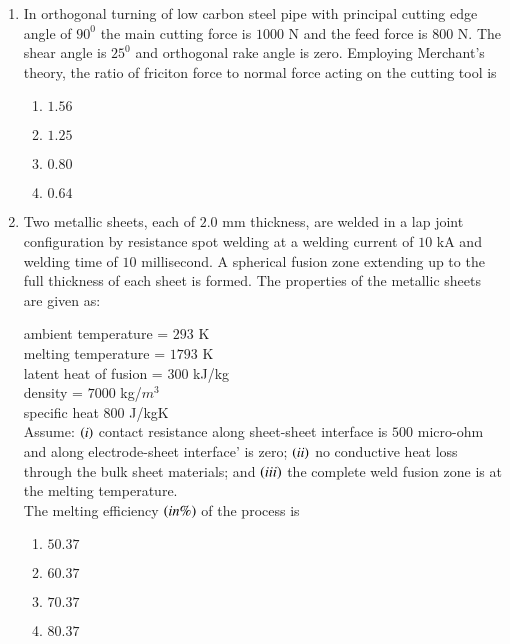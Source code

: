 \documentclass[journal]{IEEEtran}
\begin{document}
\begin{enumerate}[start = 52]
    \item In orthogonal turning of low carbon steel pipe with principal cutting edge angle of $90^{0}$ the main cutting force is $1000$ N and the feed force is $800$ N. The shear angle is $25^{0}$ and orthogonal rake angle is zero. Employing Merchant's theory, the ratio of friciton force to normal force acting on the cutting tool is
    \begin{multicols}{4}
        \begin{enumerate}
            \item $1.56$
            \item $1.25$
            \item $0.80$
            \item $0.64$
        \end{enumerate}
    \end{multicols}

    \item Two metallic sheets, each of $2.0$ mm thickness, are welded in a lap joint configuration by resistance spot welding at a welding current of $10$ kA and welding time of $10$ millisecond. A spherical fusion zone extending up to the full thickness of each sheet is formed. The properties of the metallic sheets are given as:

    ambient temperature = $293$ K \\
    melting temperature = $1793$ K \\
    latent heat of fusion = $300$ kJ/kg\\
    density = $7000$ kg/$m^{3}$ \\
    specific heat $800$ J/kgK\\
    Assume: $\left(i\right)$ contact resistance along sheet-sheet interface is $500$ micro-ohm and along electrode-sheet interface' is zero; $\left(ii\right)$ no conductive heat loss through the bulk sheet materials; and $\left(iii\right)$ the complete weld fusion zone is at the melting temperature.\\

    The melting efficiency $\left(in \%\right)$ of the process is
    \begin{multicols}{4}
        \begin{enumerate}
            \item $50.37$
            \item $60.37$
            \item $70.37$
            \item $80.37$
        \end{enumerate}
    \end{multicols}


\end{enumerate}
\end{document}
